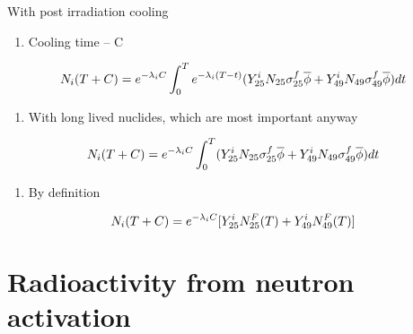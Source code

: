 \documentclass[aspectratio=1610,pdftex,dvipsnames,compress,xcolor={dvipsnames}]{beamer}
\begin{document}
\begin{frame}{With post irradiation cooling}
    \begin{enumerate}[series=outerlist,topsep=0pt,itemsep=21pt,leftmargin=*,label=(\arabic*)]
        \item[]Cooling time -- C
    \end{enumerate}
    
    \vspace*{\fill}

    \begin{equation}
        \Large
        N_i(T + C)=e^{-\lambda_iC}\int_0^Te^{-\lambda_i(T-t)} (Y_{25}^iN_{25}\sigma_{25}^f\overline{\phi} + Y_{49}^iN_{49}\sigma_{49}^f\overline{\phi})dt
    \end{equation}
    
    \vspace*{\fill}

    \begin{enumerate}[series=outerlist,topsep=0pt,itemsep=21pt,leftmargin=*,label=(\arabic*)]
        \item[]With long lived nuclides, which are most important anyway
    \end{enumerate}
    
    \vspace*{\fill}

    \begin{equation}
        \LARGE
        N_i(T + C)=e^{-\lambda_iC}\int_0^T (Y_{25}^iN_{25}\sigma_{25}^f\overline{\phi} + Y_{49}^iN_{49}\sigma_{49}^f\overline{\phi})dt
    \end{equation}
    
    \vspace*{\fill}

    \begin{enumerate}[series=outerlist,topsep=0pt,itemsep=21pt,leftmargin=*,label=(\arabic*)]
        \item[]By definition
    \end{enumerate}
    
    \vspace*{\fill}

    \begin{equation}
        \LARGE
        N_i(T + C)=e^{-\lambda_iC}[Y_{25}^iN_{25}^F(T) + Y_{49}^iN_{49}^F(T)]
    \end{equation}
\end{frame}


\section{Radioactivity from neutron activation}
\end{document}
